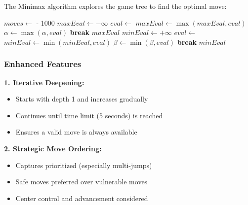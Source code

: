 \documentclass[12pt,a4paper]{article}
\begin{document}
The Minimax algorithm explores the game tree to find the optimal move:

\begin{algorithm}[H]
\caption{Strategic Minimax with Alpha-Beta Pruning}
\begin{algorithmic}[1]
        \State \Return {}
    \EndIf
    \State $moves \gets$ 
        \State \Return {} - 1000
    \EndIf
        \State $maxEval \gets -\infty$
            \State $eval \gets$ 
            \State $maxEval \gets \max(maxEval, eval)$
            \State $\alpha \gets \max(\alpha, eval)$
            \If{$\beta \leq \alpha$}
                \State \textbf{break} 
            \EndIf
        \EndFor
        \State \Return $maxEval$
    \Else
        \State $minEval \gets +\infty$
            \State $eval \gets$ 
            \State $minEval \gets \min(minEval, eval)$
            \State $\beta \gets \min(\beta, eval)$
            \If{$\beta \leq \alpha$}
                \State \textbf{break}
            \EndIf
        \EndFor
        \State \Return $minEval$
    \EndIf
\EndFunction
\end{algorithmic}
\end{algorithm}

\subsubsection{Enhanced Features}

\textbf{1. Iterative Deepening:}
\begin{itemize}
    \item Starts with depth 1 and increases gradually
    \item Continues until time limit (5 seconds) is reached
    \item Ensures a valid move is always available
\end{itemize}

\textbf{2. Strategic Move Ordering:}
\begin{itemize}
    \item Captures prioritized (especially multi-jumps)
    \item Safe moves preferred over vulnerable moves
    \item Center control and advancement considered
\end{itemize}
\end{document}
